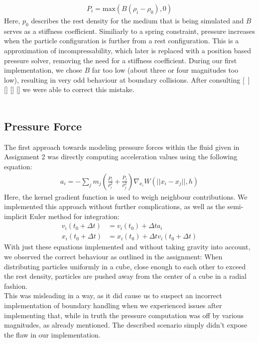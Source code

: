 \documentclass{ACGSeminar}
\begin{document}
\begin{equation} 
\begin{aligned}
P_i = \text{max}(B(\rho_i - \rho_0),0)
\end{aligned}
\end{equation}
Here, \(p_0\) describes the rest density for the medium that is being simulated and \(B\) serves as a stiffness coefficient. Similiarly to a spring constraint, pressure increases when the particle configuration is further from a rest configuration. This is a approximation of incompressability, which later is replaced with a position based pressure solver, removing the need for a stiffness coefficient.
During our first implementation, we chose \(B\) far too low (about three or four magnitudes too low), resulting in very odd behaviour at boundary collisions. After consulting [~\cite{Becker}] [\cite{Liu}] [\cite{Akinci}] [\cite{BRIDSON2016}] we were able to correct this mistake.\\
\\
\label{subsec:Pressure Force}
\subsection{Pressure Force}
The first approach towards modeling pressure forces within the fluid given in Assignment 2 was directly computing acceleration values using the following equation:\\
\begin{equation} 
\begin{aligned}
a_{i} = - \sum_{j} m_{j}(\frac{P_{i}}{\rho_{i}^{2}} + \frac{P_{j}}{\rho_{j}^{2}})\nabla_{x_{i}}W(||x_{i} -
 x_{j}||, h)
\end{aligned}
\end{equation}
Here, the kernel gradient function is used to weigh neighbour contributions. 
We implemented this approach without further complications, as well as the semi-implicit Euler method for integration:
\begin{equation} 
\begin{aligned}
v_{i}(t_0 + \Delta t) &= v_i(t_0) + \Delta t  a_i \\
x_i(t_0 + \Delta t) &= x_i(t_0) + \Delta t v_i(t_0 + \Delta t)
\end{aligned}
\end{equation}
With just these equations implemented and without taking gravity into account, we observed the correct behaviour as outlined in the assignment: When distributing particles uniformly in a cube, close enough to each other to exceed the rest density, particles are pushed away from the center of a cube in a radial fashion.\\
This was misleading in a way, as it did cause us to suspect an incorrect implementation of boundary handling when we experienced issues after implementing that, while in truth the pressure computation was off by various magnitudes, as already mentioned. The described scenario simply didn't expose the flaw in our implementation.
\end{document}
